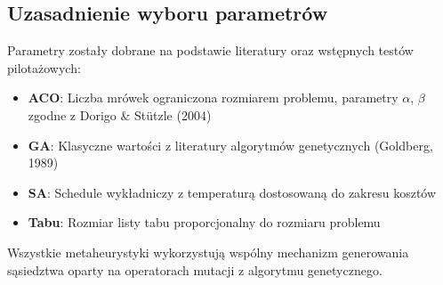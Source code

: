 \subsection{Uzasadnienie wyboru parametrów}

Parametry zostały dobrane na podstawie literatury oraz wstępnych testów pilotażowych:

\begin{itemize}
\item \textbf{ACO}: Liczba mrówek ograniczona rozmiarem problemu, parametry $\alpha$, $\beta$ zgodne z Dorigo \& Stützle (2004)
\item \textbf{GA}: Klasyczne wartości z literatury algorytmów genetycznych (Goldberg, 1989)
\item \textbf{SA}: Schedule wykładniczy z temperaturą dostosowaną do zakresu kosztów
\item \textbf{Tabu}: Rozmiar listy tabu proporcjonalny do rozmiaru problemu
\end{itemize}

Wszystkie metaheurystyki wykorzystują wspólny mechanizm generowania sąsiedztwa oparty na operatorach mutacji z algorytmu genetycznego.
